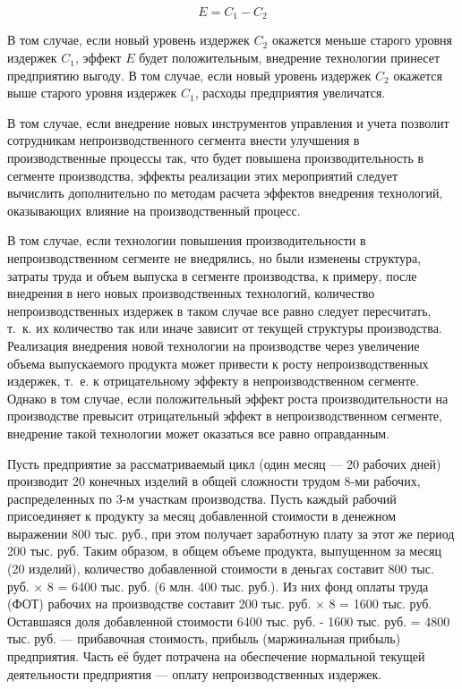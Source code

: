 \documentclass{article}
\begin{document}
$$E = C_1 - C_2$$

В том случае, если новый уровень издержек $C_2$ окажется меньше старого уровня издержек $C_1$, эффект $E$ будет положительным, внедрение технологии принесет предприятию выгоду. В том случае, если новый уровень издержек $C_2$ окажется выше старого уровня издержек $C_1$, расходы предприятия увеличатся.

В том случае, если внедрение новых инструментов управления и учета позволит сотрудникам непроизводственного сегмента внести улучшения в производственные процессы так, что будет повышена производительность в сегменте производства, эффекты реализации этих мероприятий следует вычислить дополнительно по методам расчета эффектов внедрения технологий, оказывающих влияние на производственный процесс.

В том случае, если технологии повышения производительности в непроизводственном сегменте не внедрялись, но были изменены структура, затраты труда и объем выпуска в сегменте производства, к примеру, после внедрения в него новых производственных технологий, количество непроизводственных издержек в таком случае все равно следует пересчитать, т.~к. их количество так или иначе зависит от текущей структуры производства. Реализация внедрения новой технологии на производстве через увеличение объема выпускаемого продукта может привести к росту непроизводственных издержек, т.~е. к отрицательному эффекту в непроизводственном сегменте. Однако в том случае, если положительный эффект роста производительности на производстве превысит отрицательный эффект в непроизводственном сегменте, внедрение такой технологии может оказаться все равно оправданным.

Пусть предприятие за рассматриваемый цикл (один месяц — 20 рабочих дней) производит 20 конечных изделий в общей сложности трудом 8-ми рабочих, распределенных по 3-м участкам производства. Пусть каждый рабочий присоединяет к продукту за месяц добавленной стоимости в денежном выражении 800 тыс. руб., при этом получает заработную плату за этот же период 200 тыс. руб. Таким образом, в общем объеме продукта, выпущенном за месяц (20 изделий), количество добавленной стоимости в деньгах составит 800 тыс. руб. × 8 = 6400 тыс. руб. (6 млн. 400 тыс. руб.). Из них фонд оплаты труда (ФОТ) рабочих на производстве составит 200 тыс. руб. × 8 = 1600 тыс. руб. Оставшаяся доля добавленной стоимости 6400 тыс. руб. - 1600 тыс. руб. = 4800 тыс. руб. — прибавочная стоимость, прибыль (маржинальная прибыль) предприятия. Часть её будет потрачена на обеспечение нормальной текущей деятельности предприятия — оплату непроизводственных издержек.
\end{document}
